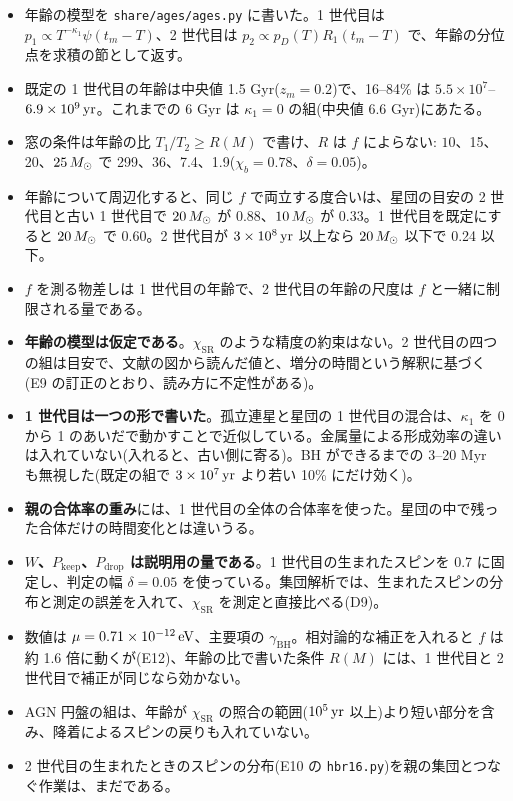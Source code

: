 \begin{result}
\begin{itemize}
\item 年齢の模型を \texttt{share/ages/ages.py} に書いた。1 世代目は $p_1\propto T^{-\kappa_1}\psi(t_m-T)$、2 世代目は $p_2\propto p_D(T)R_1(t_m-T)$ で、年齢の分位点を求積の節として返す。
\item 既定の 1 世代目の年齢は中央値 1.5 Gyr($z_m=0.2$)で、16--84\% は $5.5\times10^7$--$6.9\times10^9\,\mathrm{yr}$。これまでの 6 Gyr は $\kappa_1=0$ の組(中央値 6.6 Gyr)にあたる。
\item 窓の条件は年齢の比 $T_1/T_2\ge R(M)$ で書け、$R$ は $f$ によらない: $10$、15、20、$25\,M_\odot$ で 299、36、7.4、1.9($\chi_b=0.78$、$\delta=0.05$)。
\item 年齢について周辺化すると、同じ $f$ で両立する度合いは、星団の目安の 2 世代目と古い 1 世代目で $20\,M_\odot$ が 0.88、$10\,M_\odot$ が 0.33。1 世代目を既定にすると $20\,M_\odot$ で 0.60。2 世代目が $3\times10^8\,\mathrm{yr}$ 以上なら $20\,M_\odot$ 以下で 0.24 以下。
\item $f$ を測る物差しは 1 世代目の年齢で、2 世代目の年齢の尺度は $f$ と一緒に制限される量である。
\end{itemize}
\end{result}

\begin{caveat}
\begin{itemize}
\item \textbf{年齢の模型は仮定である}。$\chi_\mathrm{SR}$ のような精度の約束はない。2 世代目の四つの組は目安で、文献の図から読んだ値と、増分の時間という解釈に基づく(E9 の訂正のとおり、読み方に不定性がある)。
\item \textbf{1 世代目は一つの形で書いた}。孤立連星と星団の 1 世代目の混合は、$\kappa_1$ を 0 から 1 のあいだで動かすことで近似している。金属量による形成効率の違いは入れていない(入れると、古い側に寄る)。BH ができるまでの 3--20 Myr も無視した(既定の組で $3\times10^7\,\mathrm{yr}$ より若い 10\% にだけ効く)。
\item \textbf{親の合体率の重み}には、1 世代目の全体の合体率を使った。星団の中で残った合体だけの時間変化とは違いうる。
\item \textbf{$W$、$P_\mathrm{keep}$、$P_\mathrm{drop}$ は説明用の量である}。1 世代目の生まれたスピンを 0.7 に固定し、判定の幅 $\delta=0.05$ を使っている。集団解析では、生まれたスピンの分布と測定の誤差を入れて、$\chi_\mathrm{SR}$ を測定と直接比べる(D9)。
\item 数値は $\mu=0.71\times10^{-12}\,\mathrm{eV}$、主要項の $\gamma_\mathrm{BH}$。相対論的な補正を入れると $f$ は約 1.6 倍に動くが(E12)、年齢の比で書いた条件 $R(M)$ には、1 世代目と 2 世代目で補正が同じなら効かない。
\item AGN 円盤の組は、年齢が $\chi_\mathrm{SR}$ の照合の範囲($10^5\,\mathrm{yr}$ 以上)より短い部分を含み、降着によるスピンの戻りも入れていない。
\item 2 世代目の生まれたときのスピンの分布(E10 の \texttt{hbr16.py})を親の集団とつなぐ作業は、まだである。
\end{itemize}
\end{caveat}
